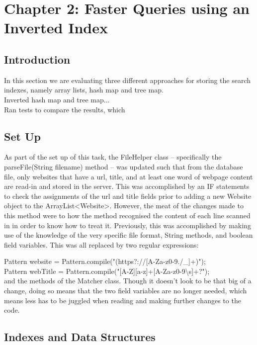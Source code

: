 \chapter{Chapter 2: Faster Queries using an Inverted Index}


\section{Introduction}
In this section we are evaluating three different approaches for storing the search indexes, namely array lists, hash map and tree map.\\
Inverted hash map and tree map...\\
Ran tests to compare the results, which \\

\section{Set Up}
As part of the set up of this task, the FileHelper class – specifically the \\ parseFile(String filename) method – was updated such that from the database file, only websites that have a url, title, and at least one word of webpage content are read-in and stored in the server.
This was accomplished by an IF statements to check the assignments of the url and title fields prior to adding a new Website object to the ArrayList<Website>.
However, the meat of the changes made to this method were to how the method recognised the content of each line scanned in in order to know how to treat it.
Previously, this was accomplished by making use of the knowledge of the very specific file format, String methods, and boolean field variables.
This was all replaced by two regular expressions:

Pattern website = Pattern.compile("(https?://[A-Za-z0-9./\_]+)"); \\
Pattern webTitle = Pattern.compile("[A-Z][a-z]+[A-Za-z0-9\textbackslash s]+?"); \\

and the methods of the Matcher class. Though it doesn’t look to be that big of a change, doing so means that the two field variables are no longer needed, which means less has to be juggled when reading and making further changes to the code.

\section{Indexes and Data Structures}
